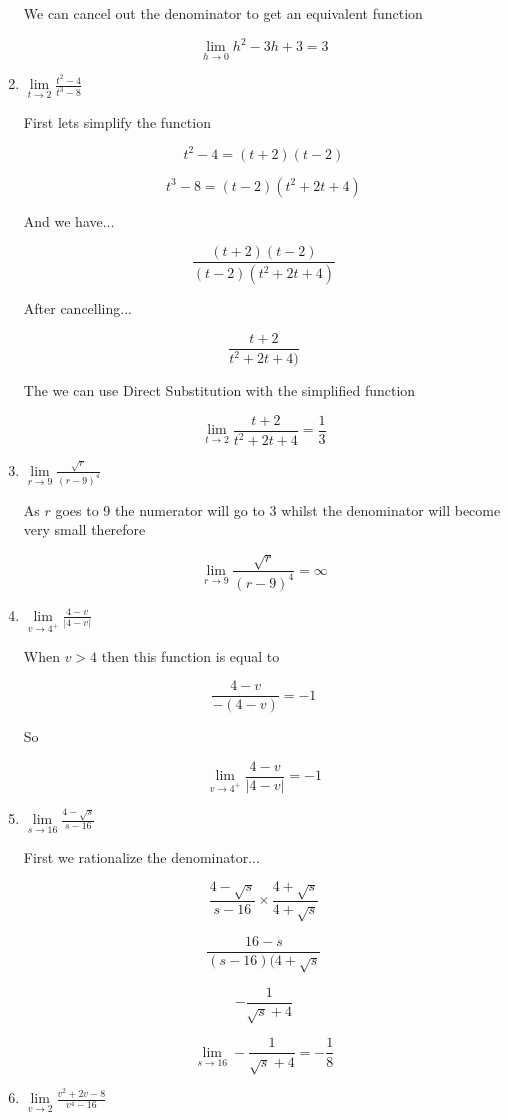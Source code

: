 \documentclass{article}
\begin{document}
\begin{enumerate}
			We can cancel out the denominator to get an equivalent function

			$$\lim \limits _{h \to 0} h^2 - 3h + 3 = 3$$

		\item $\lim \limits _{t \to 2} \frac{t^2 - 4}{t^3 - 8}$

			First lets simplify the function

			$$t^2 - 4 = (t + 2)(t-2)$$

			$$t^3 - 8 = (t-2)(t^2 + 2t + 4)$$

			And we have...

			$$\frac{(t+2)(t-2)}{(t-2)(t^2 + 2t + 4)}$$

			After cancelling...

			$$\frac{t+2}{t^2+2t+4)}$$

			The we can use Direct Substitution with the simplified function

			$$\lim \limits _{t \to 2} \frac{t+2}{t^2+2t+4} = \frac{1}{3}$$	

		\item $\lim \limits _{r \to 9} \frac{\sqrt{r}}{(r-9)^4}$

		As $r$ goes to 9 the numerator will go to 3 whilst the denominator will become
		very small therefore

		$$\lim \limits _{r \to 9} \frac{\sqrt{r}}{(r-9)^4} = \infty$$

		\item $\lim \limits _{v \to 4^{+}} \frac{4 - v}{|4 - v|}$
		
		When $v > 4$ then this function is equal to

		$$\frac{4-v}{-(4-v)} = -1$$

		So

		$$\lim \limits _{v \to 4^{+}} \frac{4-v}{|4-v|} = -1$$

		\item $\lim \limits _{s \to 16} \frac{4 - \sqrt{s}}{s - 16}$

			First we rationalize the denominator...

			$$\frac{4-\sqrt{s}}{s-16} \times \frac{4+\sqrt{s}}{4+\sqrt{s}}$$

			$$\frac{16-s}{(s-16)(4+\sqrt{s}}$$

			$$-\frac{1}{\sqrt{s} + 4}$$

			$$\lim \limits _{s \to 16} -\frac{1}{\sqrt{s} + 4} = -\frac{1}{8}$$

		\item $\lim \limits _{v \to 2} \frac{v^2 + 2v -8}{v^4 - 16}$


\end{enumerate}
\end{document}

